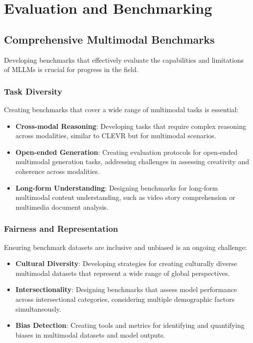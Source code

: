 \section{Evaluation and Benchmarking}

\subsection{Comprehensive Multimodal Benchmarks}
Developing benchmarks that effectively evaluate the capabilities and limitations of MLLMs is crucial for progress in the field.

\subsubsection{Task Diversity}
Creating benchmarks that cover a wide range of multimodal tasks is essential:

\begin{itemize}
    \item \textbf{Cross-modal Reasoning}: Developing tasks that require complex reasoning across modalities, similar to CLEVR \citep{johnson2017clevr} but for multimodal scenarios.
    
    \item \textbf{Open-ended Generation}: Creating evaluation protocols for open-ended multimodal generation tasks, addressing challenges in assessing creativity and coherence across modalities.
    
    \item \textbf{Long-form Understanding}: Designing benchmarks for long-form multimodal content understanding, such as video story comprehension or multimedia document analysis.
\end{itemize}

\subsubsection{Fairness and Representation}
Ensuring benchmark datasets are inclusive and unbiased is an ongoing challenge:

\begin{itemize}
    \item \textbf{Cultural Diversity}: Developing strategies for creating culturally diverse multimodal datasets that represent a wide range of global perspectives.
    
    \item \textbf{Intersectionality}: Designing benchmarks that assess model performance across intersectional categories, considering multiple demographic factors simultaneously.
    
    \item \textbf{Bias Detection}: Creating tools and metrics for identifying and quantifying biases in multimodal datasets and model outputs.
\end{itemize}

